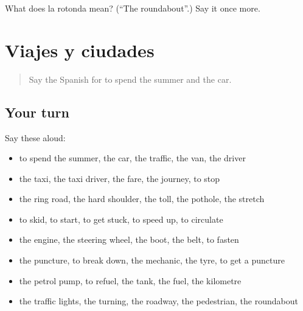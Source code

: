 \begin{tcolorbox}[breakable,colback=teal!4,colframe=teal!35!black,title={Before you move on}]
What does la rotonda mean? (\textquotedblleft{}The roundabout\textquotedblright{}.) Say it once more.
\end{tcolorbox}
\section[(dialogue)]{Viajes y ciudades}

\label{lesson:ES-R647-repaso-640-647}



\begin{quote}
Say the Spanish for to spend the summer and the car.
\end{quote}

\subsection*{Your turn}
Say these aloud:

\begin{itemize}
\raggedright
  \item to spend the summer, the car, the traffic, the van, the driver
  \item the taxi, the taxi driver, the fare, the journey, to stop
  \item the ring road, the hard shoulder, the toll, the pothole, the stretch
  \item to skid, to start, to get stuck, to speed up, to circulate
  \item the engine, the steering wheel, the boot, the belt, to fasten
  \item the puncture, to break down, the mechanic, the tyre, to get a puncture
  \item the petrol pump, to refuel, the tank, the fuel, the kilometre
  \item the traffic lights, the turning, the roadway, the pedestrian, the roundabout
\end{itemize}

